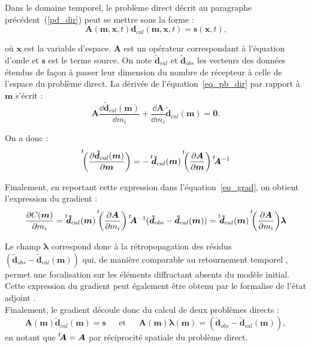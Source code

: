 Dans le domaine temporel, le problème direct décrit au paragraphe précédent~(\ref{pd_dir}) peut se mettre sous la forme :
\begin{equation}
	\bm{A}(\bm{m},\bm{x},t)\bm{d}_{cal}(\bm{m},\bm{x},t)=\bm{s}(\bm{x},t)\text{,}
	\label{eq_pb_dir}
\end{equation}

où $\bm{x}$ est la variable d'espace. $\bm{A}$ est un opérateur correspondant à l'équation d'onde et $\bm{s}$ est le terme source. On note $\bm{\tilde{d}}_{cal}$ et $\bm{\tilde{d}}_{obs}$ les vecteurs des données étendus de façon à passer leur dimension du nombre de récepteur à celle de l'espace du problème direct. La dérivée de l'équation~\ref{eq_pb_dir} par rapport à $\bm{m}$ s'écrit : 
\begin{equation}
	\bm{A} \frac{\dd \bm{\tilde{d}}_{cal}(\bm{m})}{\dd m_{i}} + \frac{\dd \bm{A}}{\dd m_{i}}\bm{\tilde{d}}_{cal}(\bm{m}) = \bm{0} \text{.}
\end{equation}

On a donc : 
\begin{equation}
	\tr{\left( \frac{\dd \bm{\tilde{d}}_{cal}(\bm{m})}{\dd \bm{m}}  \right)} = - \tr{\bm{\tilde{d}}_{cal}(\bm{m})} \tr{\left( \frac{\dd \bm{A}}{\dd \bm{m}} \right)} \tr{\bm{A}^{-1}}
	\label{sub}
\end{equation} 	

Finalement, en reportant cette expression dans l'équation~\ref{eq_grad}, on obtient l'expression du gradient : 
\begin{equation}
	 \frac{\dd C (\bm{m})}{\dd m_{i}} = \tr{\bm{\tilde{d}}_{cal}(\bm{m})}  \tr{\left( \frac{\dd \bm{A}}{\dd m_{i}}\right)} \tr{\bm{A}^{-1}} (\bm{\tilde{d}}_{obs} - \bm{\tilde{d}}_{cal}(\bm{m})) = \tr{\bm{\tilde{d}}_{cal}(\bm{m})} \tr{\left( \frac{\dd \bm{A}}{\dd m_{i}}\right)} \bm{\lambda}
	 \label{fwi:eq_grad2}
\end{equation}


Le champ $\bm{\lambda}$ correspond donc à la rétropopagation des résidus $( \bm{\tilde{d}}_{obs} - \bm{\tilde{d}}_{cal}(\bm{m}))$ qui, de manière comparable au retournement temporel \citep{prada_2002}, permet une focalisation sur les éléments diffractant absents du modèle initial. Cette expression du gradient peut également être obtenu par le formalise de l'état adjoint \citep{plessix}.\\
Finalement, le gradient découle donc du calcul de deux problèmes directs : 
\begin{equation*}
	\bm{A}(\bm{m})\bm{\tilde{d}}_{cal}(\bm{m})=\bm{s} ~~~~~~~\text{et}~~~~~~~\bm{A}(\bm{m})\bm{\lambda} (\bm{m})=( \bm{\tilde{d}}_{obs} - \bm{\tilde{d}}_{cal}(\bm{m})),
\end{equation*}
en notant que $\tr{\bm{A}}=\bm{A}$ par réciprocité spatiale du problème direct.\\


